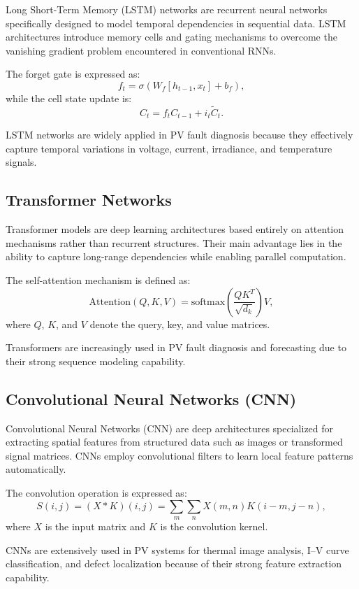 Long Short-Term Memory (LSTM) networks are recurrent neural networks specifically designed to model temporal dependencies in sequential data. LSTM architectures introduce memory cells and gating mechanisms to overcome the vanishing gradient problem encountered in conventional RNNs.

The forget gate is expressed as:
\begin{equation}
f_t=\sigma(W_f[h_{t-1},x_t]+b_f),
\end{equation}
while the cell state update is:
\begin{equation}
C_t=f_tC_{t-1}+i_t\tilde{C}_t.
\end{equation}

LSTM networks are widely applied in PV fault diagnosis because they effectively capture temporal variations in voltage, current, irradiance, and temperature signals.

\subsection{Transformer Networks}

Transformer models are deep learning architectures based entirely on attention mechanisms rather than recurrent structures. Their main advantage lies in the ability to capture long-range dependencies while enabling parallel computation.

The self-attention mechanism is defined as:
\begin{equation}
\text{Attention}(Q,K,V)=\text{softmax}\left(\frac{QK^T}{\sqrt{d_k}}\right)V,
\end{equation}
where $Q$, $K$, and $V$ denote the query, key, and value matrices.

Transformers are increasingly used in PV fault diagnosis and forecasting due to their strong sequence modeling capability.

\subsection{Convolutional Neural Networks (CNN)}

Convolutional Neural Networks (CNN) are deep architectures specialized for extracting spatial features from structured data such as images or transformed signal matrices. CNNs employ convolutional filters to learn local feature patterns automatically.

The convolution operation is expressed as:
\begin{equation}
S(i,j)=(X*K)(i,j)=\sum_m\sum_n X(m,n)K(i-m,j-n),
\end{equation}
where $X$ is the input matrix and $K$ is the convolution kernel.

CNNs are extensively used in PV systems for thermal image analysis, I--V curve classification, and defect localization because of their strong feature extraction capability.